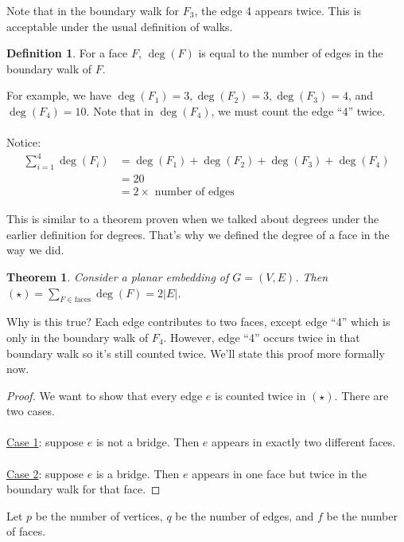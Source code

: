 \documentclass[]{article}
\newtheorem*{theorem}{Theorem}
\theoremstyle{definition}
\newtheorem*{defn}{Definition}
\begin{document}
			Note that in the boundary walk for $F_3$, the edge 4 appears twice. This is acceptable under the usual definition of walks.

			\begin{defn}
				For a face $F$, $\deg(F)$ is equal to the number of edges in the boundary walk of $F$.
			\end{defn}

			For example, we have $\deg(F_1) = 3, \deg(F_2) = 3, \deg(F_3) = 4$, and $\deg(F_4) = 10$. Note that in $\deg(F_4)$, we must count the edge ``4'' twice.
			\\ \\
			Notice:
			\begin{align*}
				\sum_{i = 1}^{4} \deg(F_i) &= \deg(F_1) + \deg(F_2) + \deg(F_3) + \deg(F_4) \\
				&= 20 \\
				&= 2 \times \text{ number of edges}
			\end{align*}

			This is similar to a theorem proven when we talked about degrees under the earlier definition for degrees. That's why we defined the degree of a face in the way we did.

			\begin{theorem}
				Consider a planar embedding of $G = (V, E)$. Then $\displaystyle (\star) = \sum_{F \in \text{faces}} \deg(F) = 2|E|$.
			\end{theorem}

			Why is this true? Each edge contributes to two faces, except edge ``4'' which is only in the boundary walk of $F_4$. However, edge ``4'' occurs twice in that boundary walk so it's still counted twice. We'll state this proof more formally now.
			\begin{proof}
				We want to show that every edge $e$ is counted twice in $(\star)$. There are two cases.
				\\ \\
				\underline{Case 1}: suppose $e$ is not a bridge. Then $e$ appears in exactly two different faces.
				\\ \\
				\underline{Case 2}: suppose $e$ is a bridge. Then $e$ appears in one face but twice in the boundary walk for that face.
			\end{proof}

			Let $p$ be the number of vertices, $q$ be the number of edges, and $f$ be the number of faces.
			
\end{document}
